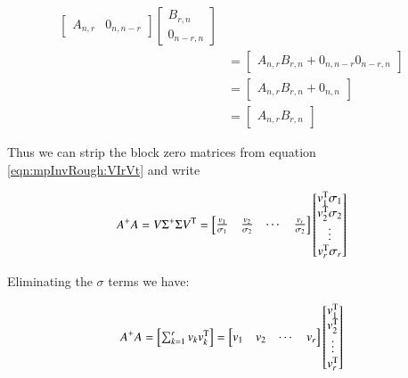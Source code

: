\begin{align*}
\begin{bmatrix}
A_{n,r} & 0_{n,n-r}
\end{bmatrix}
\begin{bmatrix}
B_{r,n} \\ 0_{n-r,n}
\end{bmatrix} \\
&=
\begin{bmatrix}
A_{n,r} B_{r,n} + 0_{n,n-r} 0_{n-r,n}
\end{bmatrix} \\
&=
\begin{bmatrix}
A_{n,r} B_{r,n} + 0_{n,n}
\end{bmatrix} \\
&=
\begin{bmatrix}
A_{n,r} B_{r,n}
\end{bmatrix}
\end{align*}

Thus we can strip the block zero matrices from equation \ref{eqn:mpInvRough:VIrVt} and write

\begin{equation}\label{eqn:mpInvRough:pseudoinversetimesmatrix}
A^{+} A =
V \Sigma^{+} \Sigma V^{\text{T}} 
=
\begin{bmatrix}
\frac{v_1}{\sigma_1} & \frac{v_2}{\sigma_2} & \cdots & \frac{v_r}{\sigma_2} 
\end{bmatrix}
\begin{bmatrix}
v_1^{\text{T}} \sigma_1 \\ v_2^{\text{T}} \sigma_2 \\ \vdots \\ v_r^{\text{T}} \sigma_r 
\end{bmatrix}
\end{equation}

Eliminating the $\sigma$ terms we have:

\begin{equation}\label{eqn:mpInvRough:pseudoinversetimesmatrixsum}
A^{+} A =
\begin{bmatrix}
\sum_{k=1}^r {v_k}v_k^{\text{T}}
\end{bmatrix}
=
\begin{bmatrix}
v_1 & v_2 & \cdots & v_r 
\end{bmatrix}
\begin{bmatrix}
v_1^{\text{T}} \\ v_2^{\text{T}} \\ \vdots \\ v_r^{\text{T}} 
\end{bmatrix}
\end{equation}


